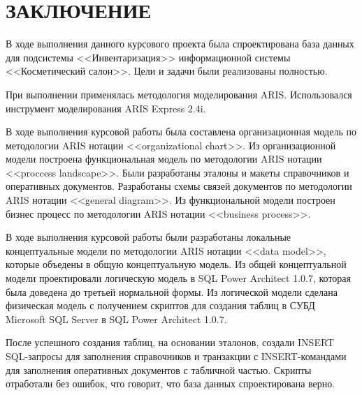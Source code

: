 {}
\section*{ЗАКЛЮЧЕНИЕ}

В ходе выполнения данного курсового проекта была спроектирована база данных
для подсистемы <<Инвентаризация>> информационной системы <<Косметический салон>>.
Цели и задачи были реализованы полностью.

При выполнении применялась методология моделирования ARIS.
Использовался инструмент моделирования ARIS Express 2.4i.

В ходе выполнения курсовой работы была составлена организационная модель по методологии ARIS нотации <<organizational chart>>.
Из организационной модели построена функциональная модель по методологии ARIS нотации <<proccess landscape>>.
Были разработаны эталоны и макеты справочников и оперативных документов.
Разработаны схемы связей документов по методологии ARIS нотации <<general diagram>>.
Из функциональной модели построен бизнес процесс по методологии ARIS нотации <<business process>>.

В ходе выполнения курсовой работы были разработаны локальные концептуальные модели по методологии ARIS нотации <<data model>>,
которые объедены в общую концептуальную модель. 
Из общей концептуальной модели проектировали
логическую модель в SQL Power Architect 1.0.7, которая была доведена до третьей нормальной формы.
Из логической модели сделана физическая модель с получением скриптов для создания
таблиц в СУБД Microsoft SQL Server в SQL Power Architect 1.0.7.

После успешного создания таблиц, на основании эталонов, создали INSERT SQL-запросы для
заполнения справочников и транзакции с INSERT-командами для заполнения оперативных документов с табличной частью.
Скрипты отработали без ошибок, что говорит, что база данных спроектирована верно.

\newpage
